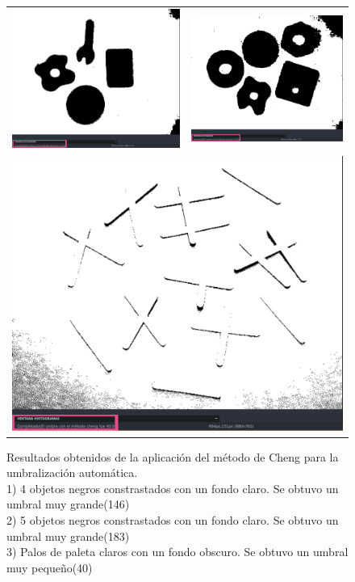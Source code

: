 	\begin{figure}[!h]
		\begin{tabular}{cc}
			\includegraphics[width=10cm]{Imagenes/Cheng_1.png} & \includegraphics[width=9cm]{Imagenes/Cheng_2.png} \\
			\multicolumn{2}{c}{\includegraphics[width=11cm]{Imagenes/Cheng_3.png}}
		\end{tabular}
		\label{Cheng}
		\caption{Resultados obtenidos de la aplicación del método de Cheng para la umbralización automática. \\ 1) 4 objetos negros constrastados con un fondo claro. Se obtuvo un umbral muy grande(146) \\ 2) 5 objetos negros constrastados con un fondo claro. Se obtuvo un umbral muy grande(183) \\ 3) Palos de paleta claros con un fondo obscuro. Se obtuvo un umbral muy pequeño(40)}
	\end{figure}
